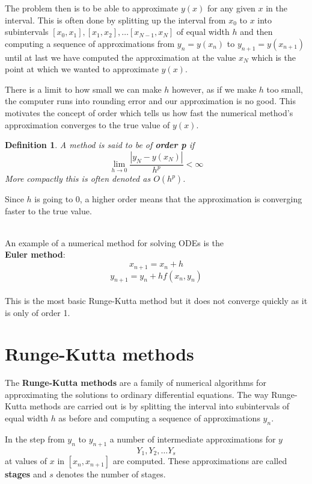 \documentclass[12pt]{amsart}
\newtheorem*{orderp}{Definition}
\begin{document}
  The problem then is to be able to approximate $y(x)$ for any given $x$ in the interval. This is 
  often done by splitting up the interval from $x_0$ to $x$ into subintervals 
  $[x_0, x_1], [x_1, x_2], \dots [x_{N-1},x_N]$ of equal width $h$ and then computing a 
  sequence of approximations from $y_n = y(x_n)$ to $y_{n+1} = y(x_{n+1})$ until 
  at last we have computed the approximation at the value $x_N$ which is the point at 
  which we wanted to approximate $y(x)$.

  There is a limit to how small we can make $h$ however, as if we make $h$ too small, the 
  computer runs into rounding error and our approximation is no good. This motivates the concept
  of order which tells us how fast the numerical method's approximation converges to the true 
  value of $y(x)$. 
  
  \begin{orderp} A method is said to be of \textbf{order p} if 
  $$\lim_{h \to 0} \frac{|y_N - y(x_N)|}{h^p} < \infty$$
  More compactly this is often denoted as $O(h^p)$.
  \end{orderp}

  Since $h$ is going to $0$, a higher order means that the approximation
  is converging faster to the true value.
  
  ~\\
  An example of a numerical method for solving ODEs is the \\
  \textbf{Euler method}:
  $$x_{n+1} = x_n + h$$
  $$y_{n+1} = y_n + hf(x_n,y_n)$$
  \\
  This is the most basic Runge-Kutta method but it does not converge quickly as it is only of order 
  1. \pagebreak

  \section{\textbf{Runge-Kutta methods}}
  The \textbf{Runge-Kutta methods} are a family of numerical algorithms for approximating the  
  solutions to ordinary differential equations. 
  The way Runge-Kutta methods are carried out is by splitting the interval into subintervals of 
  equal width $h$ as before and computing a sequence of approximations $y_n$. 

  In the step from $y_n$ to $y_{n+1}$ a number of intermediate approximations for $y$
  $$Y_1, Y_2, \dots Y_s$$ 
  at values of $x$ in $[x_n, x_{n+1}]$ are computed. These approximations are called 
  \textbf{stages} and $s$ denotes the number of stages. 
  
\end{document}

